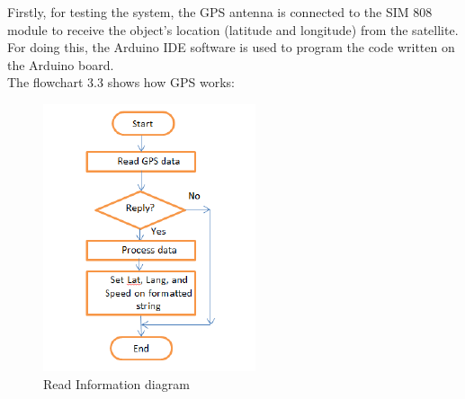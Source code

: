\newpage
Firstly, for testing the system, the GPS antenna is connected to the SIM 808 module to receive the object's location (latitude and longitude) from the satellite. For doing this, the Arduino IDE software is used to program the code written on the Arduino board.\\
\newpage
The flowchart 3.3 shows how GPS works:\\
\begin{figure}[!h]
	\centerline{\includegraphics[width=.6\textwidth]{gps-flowchart}}
	\caption{Read Information diagram \cite{8}}
\end{figure}

